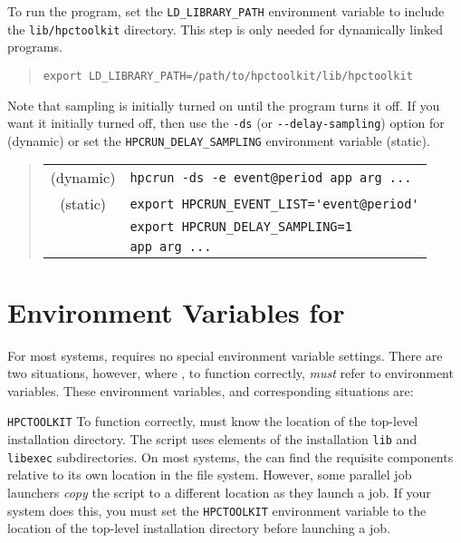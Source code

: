 To run the program, set the \verb|LD_LIBRARY_PATH| environment
variable to include the \HPCToolkit{} \verb|lib/hpctoolkit| directory.
This step is only needed for dynamically linked programs.

\begin{quote}
\begin{verbatim}
export LD_LIBRARY_PATH=/path/to/hpctoolkit/lib/hpctoolkit
\end{verbatim}
\end{quote}

Note that sampling is initially turned on until the program turns it
off.  If you want it initially turned off, then use the \verb|-ds| (or
\verb|--delay-sampling|) option for \hpcrun{} (dynamic) or set the
\verb|HPCRUN_DELAY_SAMPLING| environment variable (static).

\begin{quote}
\begin{tabular}{@{}cl}
(dynamic) & \verb|hpcrun -ds -e event@period app arg ...|  \\
(static)  & \verb|export HPCRUN_EVENT_LIST='event@period'| \\
& \verb|export HPCRUN_DELAY_SAMPLING=1| \\
& \verb|app arg ...|
\end{tabular}
\end{quote}

\section{Environment Variables for \hpcrun{}}
\label{sec:env-vars}
For most systems, \hpcrun{} requires no special environment variable settings.
There are two situations, however, where \hpcrun{}, to function correctly,
\emph{must} refer to environment variables. These environment variables, and
corresponding situations are:
\begin{description}
  \item{\verb|HPCTOOLKIT|} To function correctly, \hpcrun{} must know
       the location of the \HPCToolkit{} top-level installation directory.
       The \hpcrun{} script uses elements of the installation \verb|lib| and
       \verb|libexec| subdirectories. On most systems, the 
       \hpcrun{} can find the requisite
       components relative to its own location in the file system. 
       However, some parallel job launchers \emph{copy} the
       \hpcrun{} script to a different location as they launch a job. If your
       system does this, you must set the \verb|HPCTOOLKIT|
       environment variable to the location of the \HPCToolkit{} top-level installation directory 
       before launching a job.
\end{description}

